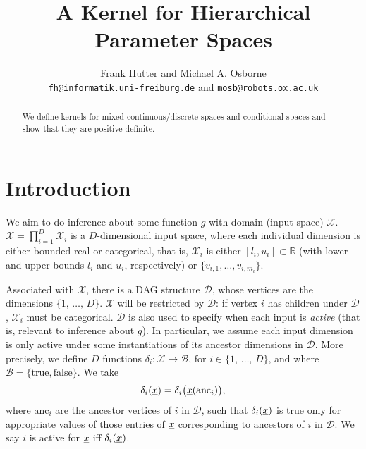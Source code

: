 \documentclass[letterpaper]{article}
\newcommand{\vect}[1]{\underline{\smash{#1}}}
\renewcommand{\v}[1]{\vect{#1}}
\newcommand{\reals}{\mathds{R}}
\newcommand{\sX}{\mathcal{X}}
\newcommand{\sD}{\mathcal{D}}
\begin{document}
\title{A Kernel for Hierarchical Parameter Spaces}

\author{Frank Hutter and Michael A. Osborne\\
{\tt fh@informatik.uni-freiburg.de} and {\tt mosb@robots.ox.ac.uk}
}

\maketitle
\begin{abstract}
\noindent{}We define kernels for mixed continuous/discrete spaces and conditional spaces and show that they are positive definite.
\end{abstract}

\section{Introduction}

We aim to do inference about some function $g$ with domain (input space) $\sX$. $\sX = \prod_{i=1}^D \sX_i$ is a $D$-dimensional input space, where each individual dimension is either bounded real or categorical, that is, $\sX_i$ is either $[l_i, u_i] \subset \reals$ (with lower and upper bounds $l_i$ and $u_i$, respectively) or $\{v_{i,1}, \dots, v_{i,m_i}\}$. 

Associated with $\sX$, there is a DAG structure $\sD$, whose vertices are the dimensions $\{1,\,\ldots,\,D\}$. $\sX$ will be restricted by $\sD$: if vertex $i$ has children under $\sD$, $\sX_i$ must be categorical. $\sD$ is also used to specify when each input is \emph{active} (that is, relevant to inference about $g$). In particular, we assume each input dimension is only active under some instantiations of its ancestor dimensions in $\sD$. More precisely, we define $D$ functions $\delta_i\colon \sX\to \mathcal{B}$, for $i \in \{1,\,\ldots,\,D\}$, and where $\mathcal{B} = \{\text{true}, \text{false}\}$. We take 
\begin{equation}
 \delta_i(\v{x}) = \delta_i\bigl(\v{x}(\text{anc}_i)\bigr),
\end{equation}
where $\text{anc}_i$ are the ancestor vertices of $i$ in $\sD$, such that $\delta_i(\v{x})$ is true only for appropriate values of those entries of $\v{x}$ corresponding to ancestors of $i$ in $\sD$. We say $i$ is active for $\v{x}$ iff $\delta_i(\v{x})$.
\end{document}
